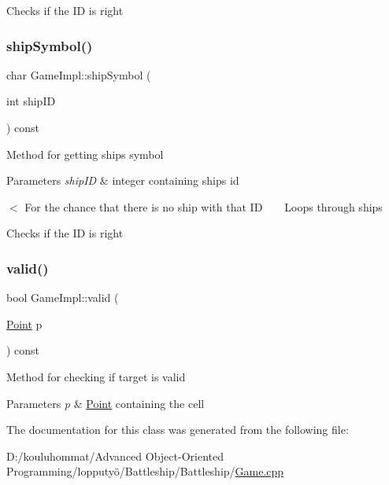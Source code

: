 Checks if the ID is right \mbox{\label{class_game_impl_a1138859824715420317de50ffb15fdb9}} 
\subsubsection{\texorpdfstring{ship\+Symbol()}{shipSymbol()}}
{\footnotesize\ttfamily char Game\+Impl\+::ship\+Symbol (\begin{DoxyParamCaption}\item[{int}]{ship\+ID }\end{DoxyParamCaption}) const}

Method for getting ship\textquotesingle{}s symbol 
\begin{DoxyParams}{Parameters}
{\em ship\+ID} & integer containing ship\textquotesingle{}s id \\
\hline
\end{DoxyParams}
$<$ For the chance that there is no ship with that ID ~\newline
~\newline
 Loops through ships

Checks if the ID is right \mbox{\label{class_game_impl_adae52d5fa830b6f0f0585e24cde3af3b}} 
\subsubsection{\texorpdfstring{valid()}{valid()}}
{\footnotesize\ttfamily bool Game\+Impl\+::valid (\begin{DoxyParamCaption}\item[{\mbox{\hyperlink{class_point}{Point}}}]{p }\end{DoxyParamCaption}) const}

Method for checking if target is valid 
\begin{DoxyParams}{Parameters}
{\em p} & \mbox{\hyperlink{class_point}{Point}} containing the cell \\
\hline
\end{DoxyParams}


The documentation for this class was generated from the following file\+:\begin{DoxyCompactItemize}
\item 
D\+:/kouluhommat/\+Advanced Object-\/\+Oriented Programming/lopputyö/\+Battleship/\+Battleship/\mbox{\hyperlink{_game_8cpp}{Game.\+cpp}}\end{DoxyCompactItemize}
